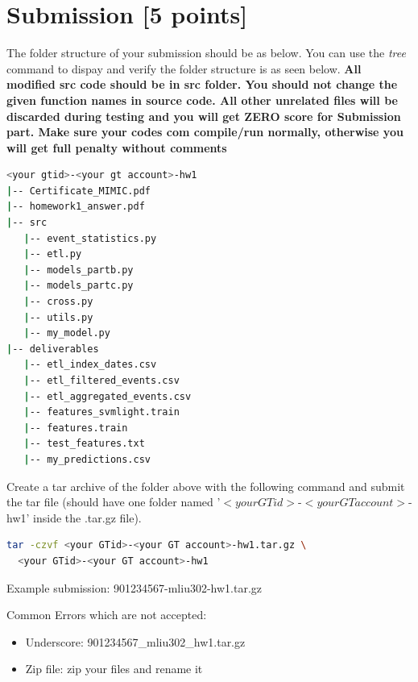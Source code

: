 \documentclass[12pt]{article}
\begin{document}

\section{Submission [5 points]}
The folder structure of your submission should be as below. You can use the \textit{tree} command to dispay and verify the folder structure is as seen below. \textbf{\color{red} All modified src code should be in src folder. You should not change the given function names in source code. All other unrelated files will be discarded during testing and you will get ZERO score for Submission part. Make sure your codes com compile/run normally, otherwise you will get full penalty without comments}
\begin{lstlisting}[language=bash,frame=single]
<your gtid>-<your gt account>-hw1
|-- Certificate_MIMIC.pdf
|-- homework1_answer.pdf
|-- src
   |-- event_statistics.py
   |-- etl.py
   |-- models_partb.py
   |-- models_partc.py
   |-- cross.py
   |-- utils.py
   |-- my_model.py
|-- deliverables
   |-- etl_index_dates.csv
   |-- etl_filtered_events.csv
   |-- etl_aggregated_events.csv
   |-- features_svmlight.train
   |-- features.train
   |-- test_features.txt
   |-- my_predictions.csv

\end{lstlisting}
Create a tar archive of the folder above with the following command and submit the tar file (should have one folder named '$<your GTid>$-$<your GT account>$-hw1' inside the .tar.gz file).
\begin{lstlisting}[language=bash,frame=single]
tar -czvf <your GTid>-<your GT account>-hw1.tar.gz \
  <your GTid>-<your GT account>-hw1
\end{lstlisting}
Example submission: 901234567-mliu302-hw1.tar.gz
\newline

\noindent Common Errors which are not accepted:
\begin{itemize}
\item Underscore: 901234567\_mliu302\_hw1.tar.gz   
\item Zip file: zip your files and rename it
\end{itemize}
\end{document}
